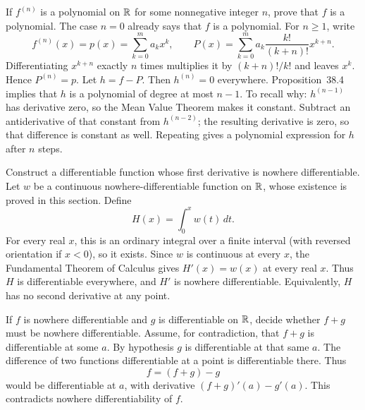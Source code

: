\goal If $f^{(n)}$ is a polynomial on $\mathbb{R}$ for some nonnegative
integer $n$, prove that $f$ is a polynomial.
The case $n=0$ already says that $f$ is a polynomial. For $n\geq1$,
write
\[
 f^{(n)}(x)=p(x)=\sum_{k=0}^m a_kx^k,
 \qquad
 P(x)=\sum_{k=0}^m a_k\frac{k!}{(k+n)!}x^{k+n}.
\]
Differentiating $x^{k+n}$ exactly $n$ times multiplies it by
$(k+n)!/k!$ and leaves $x^k$. Hence $P^{(n)}=p$.
Let $h=f-P$. Then $h^{(n)}=0$ everywhere. Proposition~38.4
implies that $h$ is a polynomial of degree at most $n-1$.
To recall why: $h^{(n-1)}$ has derivative zero, so the Mean Value
Theorem makes it constant. Subtract an antiderivative of that
constant from $h^{(n-2)}$; the resulting derivative is zero,
so that difference is constant as well. Repeating gives a polynomial
expression for $h$ after $n$ steps.

\goal Construct a differentiable function whose first derivative
is nowhere differentiable.
Let $w$ be a continuous nowhere-differentiable function on $\mathbb{R}$,
whose existence is proved in this section. Define
\[
 H(x)=\int_0^x w(t)\,dt.
\]
For every real $x$, this is an ordinary integral over a finite
interval (with reversed orientation if $x<0$), so it exists.
Since $w$ is continuous at every $x$, the Fundamental Theorem of
Calculus gives $H'(x)=w(x)$ at every real $x$. Thus $H$ is
differentiable everywhere, and $H'$ is nowhere differentiable.
Equivalently, $H$ has no second derivative at any point.

\goal If $f$ is nowhere differentiable and $g$ is differentiable
on $\mathbb{R}$, decide whether $f+g$ must be nowhere differentiable.
Assume, for contradiction, that $f+g$ is differentiable at some
$a$. By hypothesis $g$ is differentiable at that same $a$.
The difference of two functions differentiable at a point is
differentiable there. Thus
\[
 f=(f+g)-g
\]
would be differentiable at $a$, with derivative
$(f+g)'(a)-g'(a)$. This contradicts nowhere differentiability of $f$.

